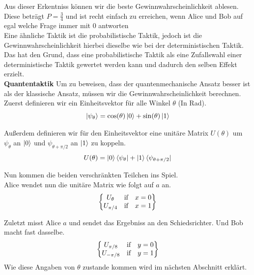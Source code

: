 Aus dieser Erkentniss können wir die beste Gewinnwahrscheinlichkeit ablesen.
Diese beträgt $P = \frac{3}{4}$ und ist recht einfach zu erreichen, wenn Alice und Bob auf egal welche Frage immer mit $0$ antworten\\

Eine ähnliche Taktik ist die probabilistische Taktik, jedoch ist die Gewinnwahrscheinlichkeit hierbei dieselbe wie bei der deterministischen Taktik.
Das hat den Grund, dass eine probabilistische Taktik als eine Zufallswahl einer deterministische Taktik gewertet werden kann und dadurch den selben Effekt erzielt.\\

\textbf{Quantentaktik}
Um zu beweisen, dass der quantenmechanische Ansatz besser ist als der klassische Ansatz, müssen wir die Gewinnwahrscheinlichkeit berechnen.\\

Zuerst definieren wir ein Einheitsvektor für alle Winkel $\theta$ (In Rad).
\begin{equation}
    \ket{\psi_\theta} = \cos(\theta) \ket{0} + \sin(\theta) \ket{1}
\end{equation}

Außerdem definieren wir für den Einheitsvektor eine unitäre Matrix $U(\theta)$ um $\psi_\theta$ an $\ket{0}$ und $\psi_{\theta+\pi/2}$ an $\ket{1}$ zu koppeln.
\begin{equation}
    U(\theta) = \ket{0}\bra{\psi_\theta} + \ket{1}\bra{\psi_{\theta+\pi/2}}
\end{equation}

Nun kommen die beiden verschränkten Teilchen ins Spiel.\\

Alice wendet nun die unitäre Matrix wie folgt auf $a$ an.
\begin{equation}
    \begin{Bmatrix}
        U_\theta & \hbox{if} & x = 0 \\
        U_{\pi/4} & \hbox{if} & x = 1
    \end{Bmatrix}
\end{equation}

Zuletzt misst Alice $a$ und sendet das Ergebniss an den Schiedsrichter. Und Bob macht fast dasselbe.
\begin{equation}
    \begin{Bmatrix}
        U_{\pi/8} & \hbox{if} & y = 0 \\
        U_{-\pi/8} & \hbox{if} & y = 1
    \end{Bmatrix}
\end{equation}
Wie diese Angaben von $\theta$ zustande kommen wird im nächsten Abschnitt erklärt.\\

